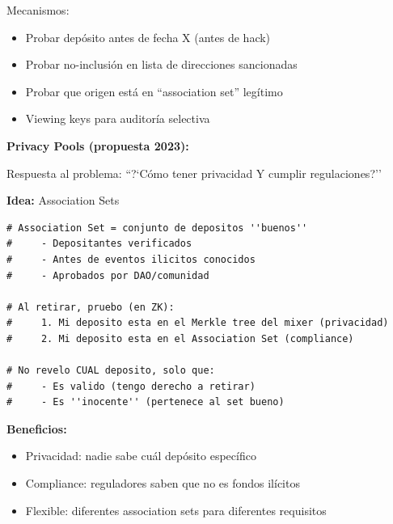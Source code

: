 \documentclass[11pt,a4paper,twoside]{book}
\begin{document}
Mecanismos:
\begin{itemize}
    \item Probar dep\'osito antes de fecha X (antes de hack)
    \item Probar no-inclusi\'on en lista de direcciones sancionadas
    \item Probar que origen est\'a en ``association set'' leg\'itimo
    \item Viewing keys para auditor\'ia selectiva
\end{itemize}

\begin{keyidea}
\textbf{Privacy Pools (propuesta 2023):}

Respuesta al problema: ``?`C\'omo tener privacidad Y cumplir regulaciones?''

\textbf{Idea:} Association Sets

\begin{lstlisting}[style=python]
# Association Set = conjunto de depositos ''buenos''
#     - Depositantes verificados
#     - Antes de eventos ilicitos conocidos
#     - Aprobados por DAO/comunidad

# Al retirar, pruebo (en ZK):
#     1. Mi deposito esta en el Merkle tree del mixer (privacidad)
#     2. Mi deposito esta en el Association Set (compliance)

# No revelo CUAL deposito, solo que:
#     - Es valido (tengo derecho a retirar)
#     - Es ''inocente'' (pertenece al set bueno)
\end{lstlisting}

\textbf{Beneficios:}
\begin{itemize}
    \item Privacidad: nadie sabe cu\'al dep\'osito espec\'ifico
    \item Compliance: reguladores saben que no es fondos il\'icitos
    \item Flexible: diferentes association sets para diferentes requisitos
\end{itemize}
\end{keyidea}
\end{document}
